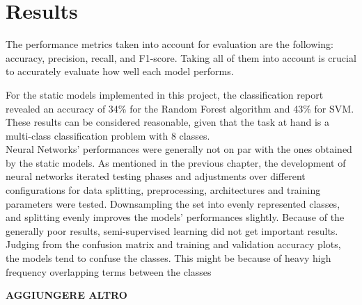 \chapter*{Results}
\label{ch:results}
The performance metrics taken into account for evaluation are the following:
accuracy, precision, recall, and F1-score. Taking all of them into account
is crucial to accurately evaluate how well each model performs.

For the static models implemented in this project, the classification report
revealed an accuracy of 34\% for the Random Forest algorithm and 43\% for SVM. 
These results can be considered reasonable, given that the task at hand is a
multi-class classification problem with 8 classes.\\

Neural Networks' performances were generally not on par with the ones obtained by
the static models.
As mentioned in the previous chapter, the development of neural networks
iterated testing phases and adjustments over different configurations for data
splitting, preprocessing, architectures and training parameters were tested.
Downsampling the set into evenly represented classes, and splitting evenly
improves the models' performances slightly.
Because of the generally poor results, semi-supervised learning did not get
important results.
Judging from the confusion matrix %
and training and validation accuracy plots, the models tend to confuse the classes.
This might be because of heavy high frequency overlapping terms between the classes


\textbf{AGGIUNGERE ALTRO}